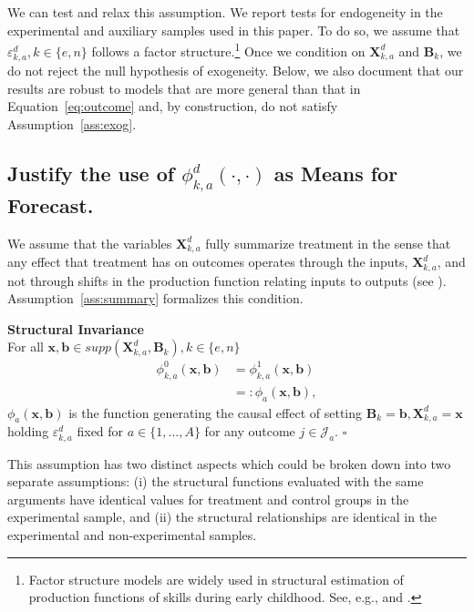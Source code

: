 \noindent We can test and relax this assumption. We report tests for endogeneity in the experimental and auxiliary samples used in this paper. To do so, we assume that $\varepsilon_{k,a}^d, k \in \{e,n\}$ follows a factor structure.\footnote{Factor structure models are widely used in structural estimation of production functions of skills during early childhood. See, e.g., \citet{Cunha_Heckman_2008_JHR} and \citet{Cunha_Heckman_etal_2010_est_tech_cognoncog}.} Once we condition on $\bm{X}_{k,a}^d$ and $\bm{B}_{k}$, we do not reject the null hypothesis of exogeneity. Below, we also document that our results are robust to models that are more general than that in Equation~\eqref{eq:outcome} and, by construction, do not satisfy Assumption~\ref{ass:exog}.\\

\subsection{Justify the use of  $\phi^d_{k,a}\left( \cdot, \cdot \right)$ as Means for Forecast.}

\noindent We assume that the variables $\bm{X}_{k,a}^d$ fully summarize treatment in the sense that any effect that treatment has on outcomes operates through the inputs, $\bm{X}_{k,a}^d$, and not through shifts in the production function relating inputs to outputs (see \citealp{Heckman_Pinto_etal_2013_PerryFactor}). Assumption~\ref{ass:summary} formalizes this condition.

\begin{assumption} \label{ass:summary} \textbf{Structural Invariance}\\
For all $\bm{x}, \bm{b} \in supp(\bm{X}^d_{k,a}, \bm{B}_k), k \in \{e,n\}$
\begin{align}
\phi_{k,a}^0 \left( \bm{x}, \bm{b} \right) &= \phi_{k,a}^1 (\bm{x}, \bm{b}) \\   \nonumber                                                                     &=: \phi_{a} (\bm{x}, \bm{b}),
\end{align}
$\phi_{a}(\bm{x}, \bm{b})$ is the function generating the causal effect of setting $ \bm{B}_k=\bm{b}, \bm{X}^d_{k,a}=\bm{x}$ holding $\varepsilon^d_{k,a}$ fixed for $a \in \{1,\dots,A\}$ for any outcome $j \in \mathcal{J}_{a}$. $\square$
\end{assumption}

\noindent This assumption has two distinct aspects which could be broken down into two separate assumptions: (i) the structural functions evaluated with the same arguments have identical values for treatment and control groups in the experimental sample, and (ii) the structural relationships are identical in the experimental and non-experimental samples.\\

